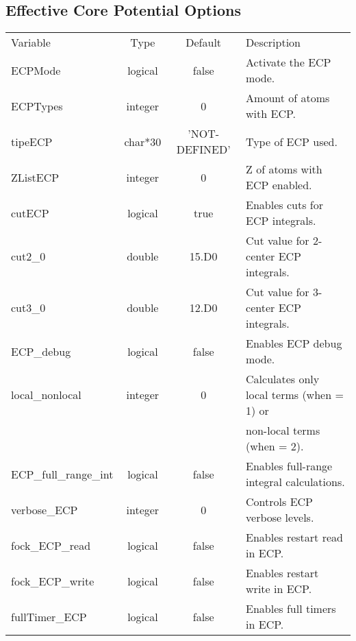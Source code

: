 \documentclass[journal=jctcce,manuscript=article]{achemso}
\begin{document}
    \subsection{Effective Core Potential Options}
    \begin{table}  [H]
      \begin{center}
      \begin{tabular}{ l c c l}
         Variable              & Type    & Default & Description \\
         ECPMode               & logical & false         & Activate the ECP mode.  \\
         ECPTypes              & integer & 0             & Amount of atoms with ECP.\\
         tipeECP               & char*30 & 'NOT-DEFINED' & Type of ECP used.\\
         ZListECP              & integer & 0             & Z of atoms with ECP enabled.\\
         cutECP                & logical & true          & Enables cuts for ECP integrals.\\
         cut2\_0               & double  & 15.D0         & Cut value for 2-center ECP integrals. \\
         cut3\_0               & double  & 12.D0         & Cut value for 3-center ECP integrals.\\
         ECP\_debug            & logical & false         & Enables ECP debug mode.\\
         local\_nonlocal       & integer & 0             & Calculates only local terms (when = 1) or \\
         &&                                              & non-local terms (when = 2). \\
         ECP\_full\_range\_int & logical & false         & Enables full-range integral calculations.\\
         verbose\_ECP          & integer & 0             & Controls ECP verbose levels. \\
         fock\_ECP\_read       & logical & false         & Enables restart read in ECP.\\
         fock\_ECP\_write      & logical & false         & Enables restart write in ECP.\\
         fullTimer\_ECP        & logical & false         & Enables full timers in ECP.\\
       \end{tabular}
       \end{center}
      \label{lio.ecp.var}
    \end{table}        
    
\end{document}
